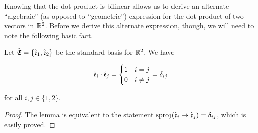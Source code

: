 Knowing that the dot product is bilinear allows us to derive an alternate ``algebraic'' (as opposed to ``geometric'') expression for the dot product of two vectors in $\mathbb{R}^2$. Before we derive this alternate expression, though, we will need to note the following basic fact.

\begin{lemma}
    Let ${\hat{\mathfrak{E}}} = \{\hat{\mathfrak{e}}_1, \hat{\mathfrak{e}}_2 \}$ be the standard basis for $\mathbb{R}^2$. We have
    
    \begin{align*}
        \hat{\mathfrak{e}}_i \cdot \hat{\mathfrak{e}}_j = 
        \begin{cases}
            1 & i = j \\
            0 & i \neq j
        \end{cases}
        = \delta_{ij}
    \end{align*}

    for all $i, j \in \{1, 2\}$.
\end{lemma}

\begin{proof}
   The lemma is equivalent to the statement $\text{sproj}(\hat{\mathfrak{e}}_i \rightarrow \hat{\mathfrak{e}}_j) = \delta_{ij}$, which is easily proved.
\end{proof}

